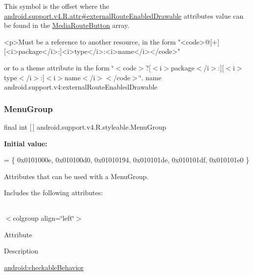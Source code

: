 This symbol is the offset where the \hyperlink{classandroid_1_1support_1_1v4_1_1R_1_1attr_a9093b99d885b00ebfb4ceb7d8f2ca206}{android.\+support.\+v4.\+R.\+attr\#external\+Route\+Enabled\+Drawable} attribute\textquotesingle{}s value can be found in the \hyperlink{classandroid_1_1support_1_1v4_1_1R_1_1styleable_ae8d0883da61f12dee4f79a15ab16cd9b}{Media\+Route\+Button} array.

\begin{DoxyVerb}      <p>Must be a reference to another resource, in the form "<code>@[+][<i>package</i>:]<i>type</i>:<i>name</i></code>"
\end{DoxyVerb}
 or to a theme attribute in the form \char`\"{}$<$code$>$?\mbox{[}$<$i$>$package$<$/i$>$\+:\mbox{]}\mbox{[}$<$i$>$type$<$/i$>$\+:\mbox{]}$<$i$>$name$<$/i$>$$<$/code$>$\char`\"{}.  name android.\+support.\+v4\+:external\+Route\+Enabled\+Drawable \mbox{\label{classandroid_1_1support_1_1v4_1_1R_1_1styleable_a83610c6b8679a40b3508815b6fd56980}} 
\subsubsection{\texorpdfstring{Menu\+Group}{MenuGroup}}
{\footnotesize\ttfamily final int \mbox{[}$\,$\mbox{]} android.\+support.\+v4.\+R.\+styleable.\+Menu\+Group\hspace{0.3cm}{\ttfamily [static]}}

{\bfseries Initial value\+:}
\begin{DoxyCode}
= \{
            0x0101000e, 0x010100d0, 0x01010194, 0x010101de,
            0x010101df, 0x010101e0
        \}
\end{DoxyCode}
Attributes that can be used with a Menu\+Group. 

Includes the following attributes\+:

\tabulinesep=1mm
\begin{longtabu} spread 0pt [c]{*{0}{|X[-1]}|}
\hline
\end{longtabu}
$<$colgroup align=\char`\"{}left\char`\"{}$>$ 

Attribute

Description 

{\ttfamily \hyperlink{classandroid_1_1support_1_1v4_1_1R_1_1styleable_a3fb026c5081357018f4b79cc18961297}{android\+:checkable\+Behavior}}

